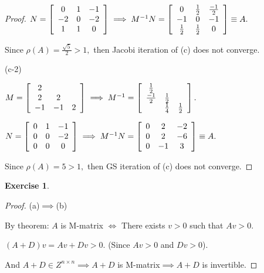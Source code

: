 \documentclass[11pt,a4paper]{article}
\renewcommand{\(}{\left(}
\renewcommand{\)}{\right)}
\newtheorem{exercise}{Exercise}
\begin{document}
\begin{proof}
  	$N=\left[
  	\begin{array}
  	[c]{ccc}%
  	0 & 1 & -1\\
  	-2 & 0 & -2\\
  	1 & 1 & 0
  	\end{array}
  	\right]  \implies M^{-1}N=\left[
  	\begin{array}
  	[c]{ccc}%
  	0 & \frac{1}{2} & \frac{-1}{2}\\
  	-1 & 0 & -1\\
  	\frac{1}{2} & \frac{1}{2} & 0
  	\end{array}
  	\right]  \equiv A.$
  	
  	Since $\rho(A)=\frac{\sqrt{5}}{2}>1,$ then Jacobi iteration of (c) does not converge.
  	
  	(c-2)
  	
  	$M=\left[
  	\begin{array}
  	[c]{ccc}%
  	2 &  & \\
  	2 & 2 & \\
  	-1 & -1 & 2
  	\end{array}
  	\right]  \implies M^{-1}=\left[
  	\begin{array}
  	[c]{ccc}%
  	\frac{1}{2} &  & \\
  	\frac{-1}{2} & \frac{1}{2} & \\
  	& \frac{1}{4} & \frac{1}{2}%
  	\end{array}
  	\right]  .$
  	
  	$N=\left[
  	\begin{array}
  	[c]{ccc}%
  	0 & 1 & -1\\
  	0 & 0 & -2\\
  	0 & 0 & 0
  	\end{array}
  	\right]  \implies M^{-1}N=\left[
  	\begin{array}
  	[c]{ccc}%
  	0 & 2 & -2\\
  	0 & 2 & -6\\
  	0 & -1 & 3
  	\end{array}
  	\right]  \equiv A.$
  	
  	Since $\rho(A)=5>1,$ then GS iteration of (c) does not converge.
  \end{proof}

  \begin{exercise}
  \end{exercise}  
  \begin{proof}
  	(a)$\implies$(b)
  	
  	By theorem: $A$ is M-matrix $\iff$ There exists $v>0$ such that $Av>0.$
  	
  	$(A+D)v=Av+Dv>0.$ (Since $Av>0$ and $Dv>0$).
  	
  	And $A+D\in Z^{n\times n}\implies A+D$ is M-matrix$\implies A+D$ is invertible.
  	
  \end{proof}
\end{document}
